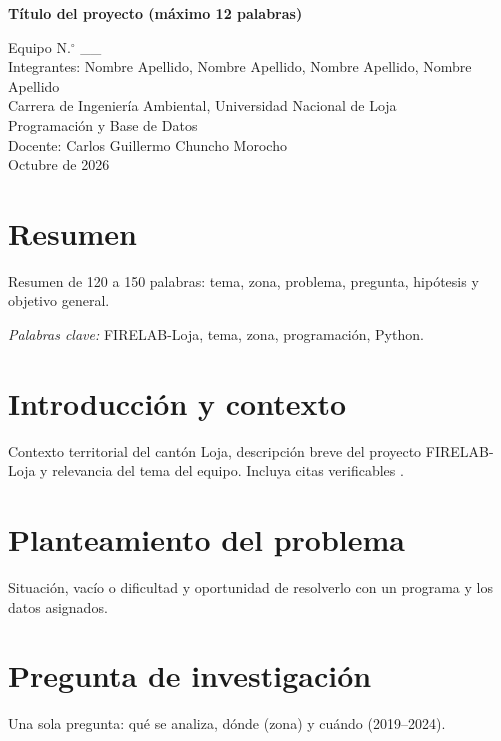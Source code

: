 \documentclass[12pt,a4paper]{article}
\begin{document}
\begin{titlepage}
\centering
\singlespacing
\vspace*{2cm}
{\bfseries T\'itulo del proyecto (m\'aximo 12 palabras)\par}
\vspace{1.5cm}
Equipo N.$^{\circ}$ \_\_\ \\
Integrantes: Nombre Apellido, Nombre Apellido, Nombre Apellido, Nombre Apellido\\[1cm]
Carrera de Ingenier\'ia Ambiental, Universidad Nacional de Loja\\
Programaci\'on y Base de Datos\\
Docente: Carlos Guillermo Chuncho Morocho\\[1cm]
Octubre de 2026
\end{titlepage}

\section*{Resumen}
\singlespacing
Resumen de 120 a 150 palabras: tema, zona, problema, pregunta, hip\'otesis y objetivo general.

\noindent\textit{Palabras clave:} FIRELAB-Loja, tema, zona, programaci\'on, Python.
\doublespacing
\newpage

\section{Introducci\'on y contexto}
Contexto territorial del cant\'on Loja, descripci\'on breve del proyecto FIRELAB-Loja y relevancia del tema del equipo. Incluya citas verificables \parencite{firelab2025}.

\section{Planteamiento del problema}
Situaci\'on, vac\'io o dificultad y oportunidad de resolverlo con un programa y los datos asignados.

\section{Pregunta de investigaci\'on}
Una sola pregunta: qu\'e se analiza, d\'onde (zona) y cu\'ando (2019--2024).
\end{document}
